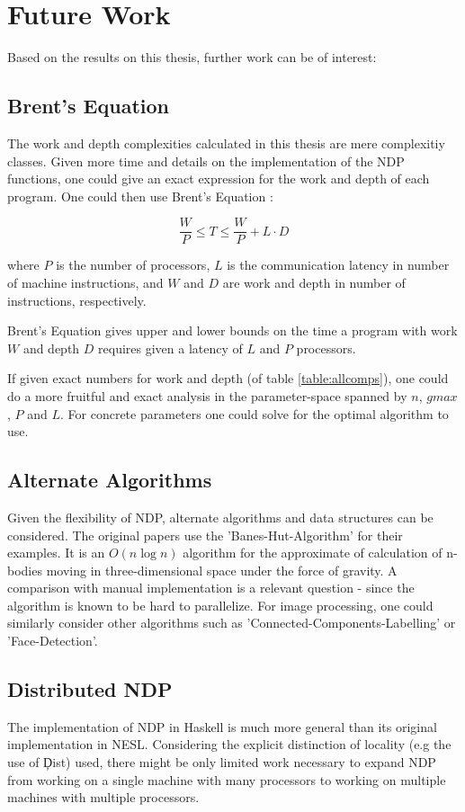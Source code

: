   
\section{Future Work}
  Based on the results on this thesis, further work can be of interest:
  
  \subsection*{Brent's Equation}
    The work and depth complexities calculated in this thesis are mere complexitiy classes.
    Given more time and details on the implementation of the NDP functions,
    one could give an exact expression for the work and depth of each program.
    One could then use Brent's Equation \cite{Brent2011}:
    
    $$ \frac{W}{P} \leq T \leq \frac{W}{P} + L \cdot D $$
    
    where $P$ is the number of processors,
    $L$ is the communication latency in number of machine instructions,
    and $W$ and $D$ are work and depth in number of instructions, respectively.
    
    Brent's Equation gives upper and lower bounds on
    the time a program with work $W$ and depth $D$
    requires given a latency of $L$ and $P$ processors.
    
    If given exact numbers for work and depth (of table \ref{table:allcomps}), one could do a
    more fruitful and exact analysis in the parameter-space
    spanned by $n$, $gmax$, $P$ and $L$.
    For concrete parameters one could solve for the optimal
    algorithm to use.
  
  \subsection*{Alternate Algorithms}
    Given the flexibility of NDP, alternate algorithms and data structures can be considered.
    The original papers \cite{Harness2008} use the 'Banes-Hut-Algorithm' for
    their examples. It is an $O(n \log n)$ algorithm for the approximate of
    calculation of n-bodies moving in three-dimensional space under the
    force of gravity. A comparison with manual implementation is
    a relevant question - since the algorithm is known
    to be hard to parallelize. For image processing,
    one could similarly consider other algorithms such as
    'Connected-Components-Labelling' or 'Face-Detection'.
    
  \subsection*{Distributed NDP}
    The implementation of NDP in Haskell is much more general than its original
    implementation in NESL. Considering the explicit distinction of locality (e.g the use of \c{Dist})
    used, there might be only limited work necessary to expand NDP from working on a single machine
    with many processors to working on multiple machines with multiple processors.

